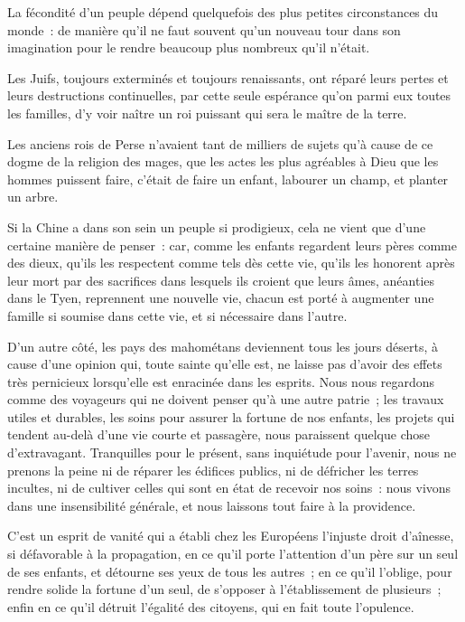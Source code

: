 \documentclass[french,twoside]{book} %
\begin{document}
\noindent La fécondité d’un peuple dépend quelquefois des plus petites circonstances du monde : de manière qu’il ne faut souvent qu’un nouveau tour dans son imagination pour le rendre beaucoup plus nombreux qu’il n’était.\par
Les Juifs, toujours exterminés et toujours renaissants, ont réparé leurs pertes et leurs destructions continuelles, par cette seule espérance qu’on parmi eux toutes les familles, d’y voir naître un roi puissant qui sera le maître de la terre.\par
Les anciens rois de Perse n’avaient tant de milliers de sujets qu’à cause de ce dogme de la religion des mages, que les actes les plus agréables à Dieu que les hommes puissent faire, c’était de faire un enfant, labourer un champ, et planter un arbre.\par
Si la Chine a dans son sein un peuple si prodigieux, cela ne vient que d’une certaine manière de penser : car, comme les enfants regardent leurs pères comme des dieux, qu’ils les respectent comme tels dès cette vie, qu’ils les honorent après leur mort par des sacrifices dans lesquels ils croient que leurs âmes, anéanties dans le Tyen, reprennent une nouvelle vie, chacun est porté à augmenter une famille si soumise dans cette vie, et si nécessaire dans l’autre.\par
D’un autre côté, les pays des mahométans deviennent tous les jours déserts, à cause d’une opinion qui, toute sainte qu’elle est, ne laisse pas d’avoir des effets très pernicieux lorsqu’elle est enracinée dans les esprits. Nous nous regardons comme des voyageurs qui ne doivent penser qu’à une autre patrie ; les travaux utiles et durables, les soins pour assurer la fortune de nos enfants, les projets qui tendent au-delà d’une vie courte et passagère, nous paraissent quelque chose d’extravagant. Tranquilles pour le présent, sans inquiétude pour l’avenir, nous ne prenons la peine ni de réparer les édifices publics, ni de défricher les terres incultes, ni de cultiver celles qui sont en état de recevoir nos soins : nous vivons dans une insensibilité générale, et nous laissons tout faire à la providence.\par
C’est un esprit de vanité qui a établi chez les Européens l’injuste droit d’aînesse, si défavorable à la propagation, en ce qu’il porte l’attention d’un père sur un seul de ses enfants, et détourne ses yeux de tous les autres ; en ce qu’il l’oblige, pour rendre solide la fortune d’un seul, de s’opposer à l’établissement de plusieurs ; enfin en ce qu’il détruit l’égalité des citoyens, qui en fait toute l’opulence.\par
\end{document}
